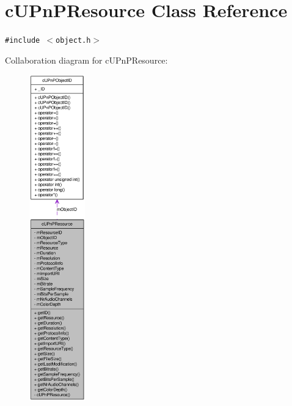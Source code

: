 \hypertarget{classcUPnPResource}{
\section{cUPnPResource Class Reference}
\label{classcUPnPResource}
}
{\tt \#include $<$object.h$>$}

Collaboration diagram for cUPnPResource:\nopagebreak
\begin{figure}[H]
\begin{center}
\leavevmode
\includegraphics[height=400pt]{classcUPnPResource__coll__graph}
\end{center}
\end{figure}
